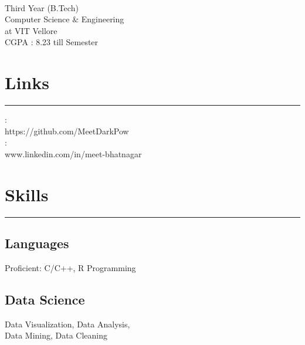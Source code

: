 \documentclass[]{meetresume-class}
\begin{document}
	
	
	\begin{minipage}[t]{0.33\textwidth} 
		\begin{large}
			\\
		\end{large}
		Third Year (B.Tech)\\
		Computer Science $\&$ Engineering\\ 
		at VIT Vellore \\ 
		CGPA : 8.23 till  Semester 
		
		\section{Links} 
		\noindent\rule{5cm}{0.6pt}
		
		\href{https://github.com/MeetDarkPow}{}:\\
		https://github.com/MeetDarkPow \\
		\href{https://www.linkedin.com/in/meet-bhatnagar-a41842181/}{}:\\
		www.linkedin.com/in/meet-bhatnagar
		\sectionsep
		\section{Skills}
		\noindent\rule{5cm}{0.6pt}
	
		
		\subsection{Languages}
		Proficient: C/C++, R Programming
		\vspace{6pt}
		
		\subsection{Data Science}
		Data Visualization, Data Analysis,\\
		Data Mining, Data Cleaning
		\vspace{6pt}
		

\end{minipage}
\end{document}

